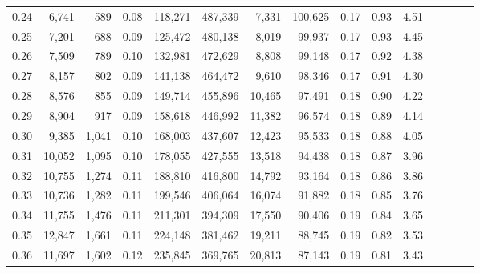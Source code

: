 \begin{tabular}{rrrcrrrrrrrrrrr}
0.24 &   6,741 &    589 &                                       0.08 &  118,271 &  487,339 &    7,331 &  100,625 &  0.17 &  0.93 &                         4.51 \\
0.25 &   7,201 &    688 &                                       0.09 &  125,472 &  480,138 &    8,019 &   99,937 &  0.17 &  0.93 &                         4.45 \\
0.26 &   7,509 &    789 &                                       0.10 &  132,981 &  472,629 &    8,808 &   99,148 &  0.17 &  0.92 &                         4.38 \\
0.27 &   8,157 &    802 &                                       0.09 &  141,138 &  464,472 &    9,610 &   98,346 &  0.17 &  0.91 &                         4.30 \\
0.28 &   8,576 &    855 &                                       0.09 &  149,714 &  455,896 &   10,465 &   97,491 &  0.18 &  0.90 &                         4.22 \\
0.29 &   8,904 &    917 &                                       0.09 &  158,618 &  446,992 &   11,382 &   96,574 &  0.18 &  0.89 &                         4.14 \\
0.30 &   9,385 &  1,041 &                                       0.10 &  168,003 &  437,607 &   12,423 &   95,533 &  0.18 &  0.88 &                         4.05 \\
0.31 &  10,052 &  1,095 &                                       0.10 &  178,055 &  427,555 &   13,518 &   94,438 &  0.18 &  0.87 &                         3.96 \\
0.32 &  10,755 &  1,274 &                                       0.11 &  188,810 &  416,800 &   14,792 &   93,164 &  0.18 &  0.86 &                         3.86 \\
0.33 &  10,736 &  1,282 &                                       0.11 &  199,546 &  406,064 &   16,074 &   91,882 &  0.18 &  0.85 &                         3.76 \\
0.34 &  11,755 &  1,476 &                                       0.11 &  211,301 &  394,309 &   17,550 &   90,406 &  0.19 &  0.84 &                         3.65 \\
0.35 &  12,847 &  1,661 &                                       0.11 &  224,148 &  381,462 &   19,211 &   88,745 &  0.19 &  0.82 &                         3.53 \\
0.36 &  11,697 &  1,602 &                                       0.12 &  235,845 &  369,765 &   20,813 &   87,143 &  0.19 &  0.81 &                         3.43 \\

\end{tabular}
